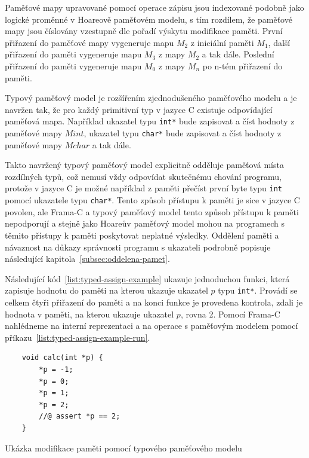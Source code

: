 Paměťové mapy upravované pomocí operace zápisu jsou indexované podobně jako logické proměnné v Hoareově paměťovém modelu,
s tím rozdílem, že paměťové mapy jsou číslovány vzestupně dle pořadí výskytu modifikace paměti.
První přiřazení do paměťové mapy vygeneruje mapu $M_2$ z iniciální paměti $M_1$,
další přiřazení do paměti vygeneruje mapu $M_3$ z mapy $M_2$ a tak dále.
Poslední přiřazení do paměti vygeneruje mapu $M_0$ z mapy $M_n$ po n-tém přiřazení do paměti.

Typový paměťový model je rozšířením zjednodušeného paměťového modelu
a je navržen tak, že pro každý primitivní typ v jazyce C existuje odpovídající paměťová mapa.
Například ukazatel typu \texttt{int*} bude zapisovat a číst hodnoty z paměťové mapy $Mint$,
ukazatel typu \texttt{char*} bude zapisovat a číst hodnoty z paměťové mapy $Mchar$ a tak dále.


Takto navržený typový paměťový model explicitně odděluje paměťová místa rozdílných typů,
což nemusí vždy odpovídat skutečnému chování programu,
protože v jazyce C je možné například z paměti přečíst první byte typu \texttt{int}
pomocí ukazatele typu \texttt{char*}.
Tento způsob přístupu k paměti je sice v jazyce C povolen,
ale Frama\mbox{-}C a typový paměťový model tento způsob přístupu k paměti nepodporují
a stejně jako Hoareův paměťový model mohou na programech s těmito přístupy k paměti poskytovat neplatné výsledky.
Oddělení paměti a návaznost na důkazy správnosti programu s ukazateli
podrobně popisuje následující kapitola~\ref{subsec:oddelena-pamet}.

Následující kód~\ref{list:typed-assign-example} ukazuje jednoduchou funkci,
která zapisuje hodnotu do paměti na kterou ukazuje ukazatel $p$ typu \texttt{int*}.
Provádí se celkem čtyři přiřazení do paměti a na konci funkce je provedena kontrola,
zdali je hodnota v paměti, na kterou ukazuje ukazatel $p$, rovna 2.
Pomocí Frama\mbox{-}C nahlédneme na interní reprezentaci
a na operace s paměťovým modelem pomocí příkazu~\ref{list:typed-assign-example-run}.

\begin{listing}[H]
    \begin{verbatim}
    void calc(int *p) {
        *p = -1;
        *p = 0;
        *p = 1;
        *p = 2;
        //@ assert *p == 2;
    }
    \end{verbatim}
    \caption{Ukázka modifikace paměti pomocí typového paměťového modelu}
    \label{list:typed-assign-example}
\end{listing}

